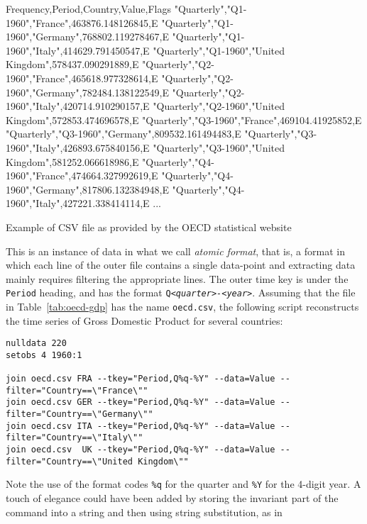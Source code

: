 \begin{table}[htbp]
\begin{code}
Frequency,Period,Country,Value,Flags
"Quarterly","Q1-1960","France",463876.148126845,E
"Quarterly","Q1-1960","Germany",768802.119278467,E
"Quarterly","Q1-1960","Italy",414629.791450547,E
"Quarterly","Q1-1960","United Kingdom",578437.090291889,E
"Quarterly","Q2-1960","France",465618.977328614,E
"Quarterly","Q2-1960","Germany",782484.138122549,E
"Quarterly","Q2-1960","Italy",420714.910290157,E
"Quarterly","Q2-1960","United Kingdom",572853.474696578,E
"Quarterly","Q3-1960","France",469104.41925852,E
"Quarterly","Q3-1960","Germany",809532.161494483,E
"Quarterly","Q3-1960","Italy",426893.675840156,E
"Quarterly","Q3-1960","United Kingdom",581252.066618986,E
"Quarterly","Q4-1960","France",474664.327992619,E
"Quarterly","Q4-1960","Germany",817806.132384948,E
"Quarterly","Q4-1960","Italy",427221.338414114,E
...
\end{code}
\caption{Example of CSV file as provided by the OECD statistical
  website}
\label{tab:oecd-gdp}  
\end{table}

This is an instance of data in what we call \emph{atomic format}, that
is, a format in which each line of the outer file contains a single
data-point and extracting data mainly requires filtering the appropriate
lines. The outer time key is under the \texttt{Period} heading, and
has the format \texttt{Q\emph{<quarter>-<year>}}. Assuming that the
file in Table~\ref{tab:oecd-gdp} has the name \texttt{oecd.csv}, the
following script reconstructs the time series of Gross Domestic
Product for several countries:

\begin{footnotesize}
\begin{verbatim}
nulldata 220
setobs 4 1960:1

join oecd.csv FRA --tkey="Period,Q%q-%Y" --data=Value --filter="Country==\"France\""
join oecd.csv GER --tkey="Period,Q%q-%Y" --data=Value --filter="Country==\"Germany\""
join oecd.csv ITA --tkey="Period,Q%q-%Y" --data=Value --filter="Country==\"Italy\""
join oecd.csv  UK --tkey="Period,Q%q-%Y" --data=Value --filter="Country==\"United Kingdom\""
\end{verbatim}
\end{footnotesize}

Note the use of the format codes \verb|%q| for the quarter and
\verb|%Y| for the 4-digit year. A touch of elegance could
have been added by storing the invariant part of the 
command into a string and then using string substitution, as in

